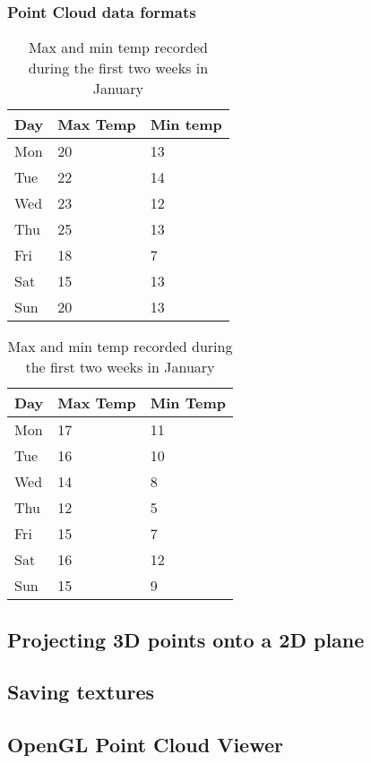 \subsubsection{Point Cloud data formats}

\begin{table}[h]
	\centering
	\begin{subtable}[h]{0.45\textwidth}
		\centering
		\begin{tabular}{l | l | l}
			Day & Max Temp & Min temp \\
			\hline \hline
			Mon & 20 & 13 \\
			Tue & 22 & 14 \\
			Wed & 23 & 12 \\
			Thu & 25 & 13 \\
			Fri & 18 & 7 \\
			Sat & 15 & 13 \\
			Sun & 20 & 13
		\end{tabular}
		\caption{First Week}
		\label{tab:week1}
	\end{subtable}
	\hfill
	\begin{subtable}[h]{0.45\textwidth}
		\centering
		\begin{tabular}{l | l | l}
			Day & Max Temp & Min Temp \\
			\hline \hline
			Mon & 17 & 11 \\
			Tue & 16 & 10 \\
			Wed & 14 & 8 \\
			Thu & 12 & 5 \\
			Fri & 15 & 7 \\
			Sat & 16 & 12 \\
			Sun & 15 & 9
		\end{tabular}
		\caption{Second Week}
		\label{tab:week2}
	\end{subtable}
	\caption{Max and min temp recorded during the first two weeks in January}
	\label{tab:temps}
\end{table}


\subsection{Projecting 3D points onto a 2D plane}


\subsection{Saving textures}


\subsection{OpenGL Point Cloud Viewer}

